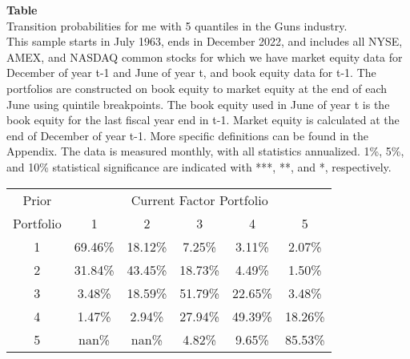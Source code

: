 \begin{table*}[ht!]
\raggedright
{}
\label{tab: transition_probs_me_Guns_with_5_quantiles}
\textbf{Table \thetable} \\
Transition probabilities for me with 5 quantiles in the Guns industry. \\
\hspace*{1em}This sample starts in July 1963, ends in December 2022, and includes all NYSE, AMEX, and NASDAQ common stocks for which we have market equity data for December of year t-1 and June of year t, and book equity data for t-1. The portfolios are constructed on book equity to market equity at the end of each June using quintile breakpoints.  The book equity used in June of year t is the book equity for the last fiscal year end in t-1.  Market equity is calculated at the end of December of year t-1.  More specific definitions can be found in the Appendix.  The data is measured monthly, with all statistics annualized.  1\%, 5\%, and 10\% statistical significance are indicated with ***, **, and *, respectively. \\
\vspace{0.5em}
\centering
\begin{adjustbox}{max width=\textwidth}
\begin{tabular}{@{}cccccc@{}}
\toprule
Prior & \multicolumn{5}{c}{Current Factor Portfolio} \\
Portfolio & 1 & 2 & 3 & 4 & 5 \\
\midrule
1 & 69.46\% & 18.12\% & 7.25\% & 3.11\% & 2.07\% \\
2 & 31.84\% & 43.45\% & 18.73\% & 4.49\% & 1.50\% \\
3 & 3.48\% & 18.59\% & 51.79\% & 22.65\% & 3.48\% \\
4 & 1.47\% & 2.94\% & 27.94\% & 49.39\% & 18.26\% \\
5 & nan\% & nan\% & 4.82\% & 9.65\% & 85.53\% \\
\bottomrule
\end{tabular}
\end{adjustbox}
\end{table*}